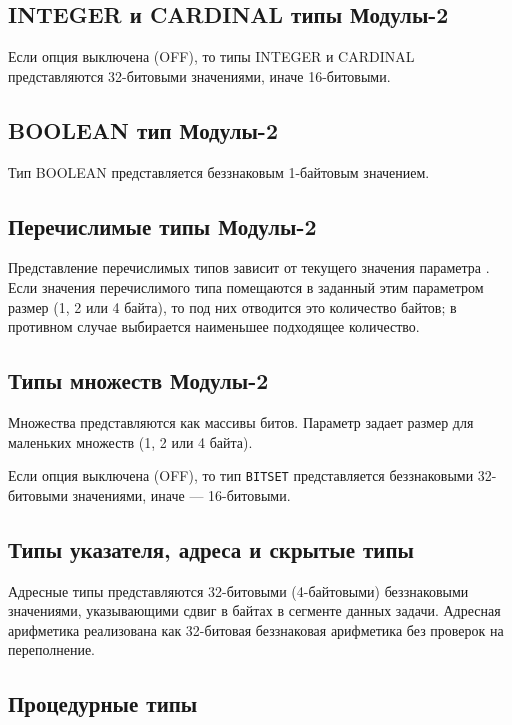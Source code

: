 \subsection{INTEGER и CARDINAL типы Модулы-2}\label{lowlevel:datarep:whole}

Если опция  выключена (OFF), то типы INTEGER и CARDINAL 
представляются 32-битовыми значениями, иначе 16-битовыми.

\subsection{BOOLEAN тип Модулы-2}\label{lowlevel:datarep:bool}

Тип BOOLEAN представляется беззнаковым 1-байтовым значением.

\subsection{Перечислимые типы Модулы-2}

Представление перечислимых типов зависит от текущего значения
параметра . Если значения перечислимого типа
помещаются в заданный этим параметром размер (1, 2 или 4 байта),
то под них отводится это количество байтов; в противном случае
выбирается наименьшее подходящее количество.

\subsection{Типы множеств Модулы-2}

Множества представляются как массивы битов. Параметр 
задает размер для маленьких множеств (1, 2 или 4 байта).

Если опция  выключена (OFF), то тип {\tt BITSET} 
представляется беззнаковыми 32-битовыми значениями, иначе --- 16-битовыми.

\subsection{Типы указателя, адреса и скрытые типы}

Адресные типы представляются 32-битовыми (4-байтовыми) беззнаковыми
значениями, указывающими сдвиг в байтах в сегменте данных задачи.
Адресная арифметика реализована как 32-битовая беззнаковая
арифметика без проверок на переполнение.

\subsection{Процедурные типы}

